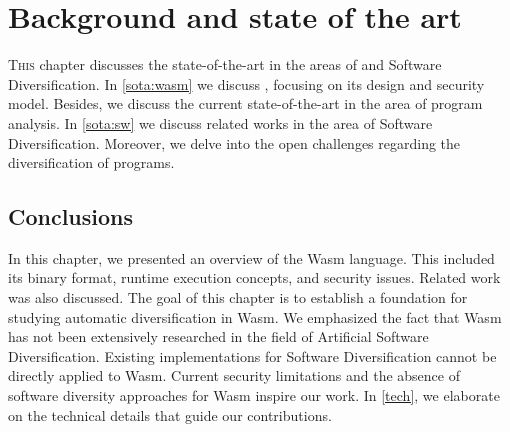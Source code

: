 \chapter{Background and state of the art}
\label{SOTA}



\lettrine[lines=3]{T}{his} chapter discusses the state-of-the-art in the areas of \Wasm and Software Diversification. 
In \autoref{sota:wasm} we discuss \Wasm, focusing on its design and security model.
Besides, we discuss the current state-of-the-art in the area of \Wasm program analysis.
In \autoref{sota:sw} we discuss related works in the area of Software Diversification.
Moreover, we delve into the open challenges regarding the diversification of \Wasm programs.






\section*{Conclusions}

In this chapter, we presented an overview of the Wasm language. 
This included its binary format, runtime execution concepts, and security issues. 
Related work was also discussed. 
The goal of this chapter is to establish a foundation for studying automatic diversification in Wasm. 
We emphasized the fact that Wasm has not been extensively researched in the field of Artificial Software Diversification. 
Existing implementations for Software Diversification cannot be directly applied to Wasm. 
Current security limitations and the absence of software diversity approaches for Wasm inspire our work. 
In \autoref{tech}, we elaborate on the technical details that guide our contributions.
